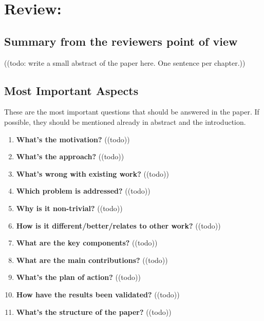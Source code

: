 \chapter*{Review: \textcolor{HighlightColor}{\metaTitle}}\label{sec:review}\vspace{.5cm}
\setcounter{chapter}{1}

\section*{Summary from the reviewers point of view}\label{sec:summary}
\noindent
\textcolor{HighlightColor}{((todo: write a small abstract of the paper here. One sentence per chapter.))}

\section{Most Important Aspects}\label{sec:mia}
These are the most important questions that should be answered in the paper. If possible,
they should be mentioned already in abstract and the introduction.
\begin{enumerate}[resume]
    \item \textbf{What’s the motivation?} 	\textcolor{HighlightColor}{((todo))}
    \item \textbf{What’s the approach?} 	\textcolor{HighlightColor}{((todo))}
    \item \textbf{What’s wrong with existing work?} 	\textcolor{HighlightColor}{((todo))}
    \item \textbf{Which problem is addressed?} 	\textcolor{HighlightColor}{((todo))}
    \item \textbf{Why is it non-trivial?
} 	\textcolor{HighlightColor}{((todo))}
    \item \textbf{How is it different/better/relates to other work?
} 	\textcolor{HighlightColor}{((todo))}
    \item \textbf{What are the key components?} 	\textcolor{HighlightColor}{((todo))}
    \item \textbf{What are the main contributions?} 	\textcolor{HighlightColor}{((todo))}
    \item \textbf{What’s the plan of action?} 	\textcolor{HighlightColor}{((todo))}
    \item \textbf{How have the results been validated?
} 	\textcolor{HighlightColor}{((todo))}
    \item \textbf{What’s the structure of the paper?} 	\textcolor{HighlightColor}{((todo))}
\end{enumerate}

